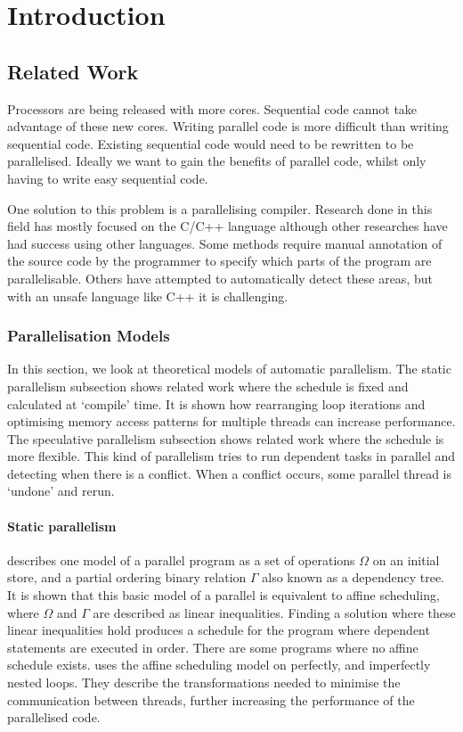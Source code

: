 \chapter{Introduction}

\section{Related Work}
\label{sec:related-work}

Processors are being released with more cores. Sequential code cannot take advantage of these new cores. Writing parallel code is more difficult than writing sequential code. Existing sequential code would need to be rewritten to be parallelised. Ideally we want to gain the benefits of parallel code, whilst only having to write easy sequential code.

One solution to this problem is a parallelising compiler. Research done in this field has mostly focused on the C/C++ language although other researches have had success using other languages. Some methods require manual annotation of the source code by the programmer to specify which parts of the program are parallelisable. Others have attempted to automatically detect these areas, but with an unsafe language like C++ it is challenging.

\subsection{Parallelisation Models}
\label{sec:related-models}
In this section, we look at theoretical models of automatic parallelism. The static parallelism subsection shows related work where the schedule is fixed and calculated at `compile' time. It is shown how rearranging loop iterations and optimising memory access patterns for multiple threads can increase performance. The speculative parallelism subsection shows related work where the schedule is more flexible. This kind of parallelism tries to run dependent tasks in parallel and detecting when there is a conflict. When a conflict occurs, some parallel thread is `undone' and rerun.

\subsubsection{Static parallelism}
\textcite{Feautrier1992} describes one model of a parallel program as a set of operations $\Omega$ on an initial store, and a partial ordering binary relation $\Gamma$ also known as a dependency tree. It is shown that this basic model of a parallel is equivalent to affine scheduling, where $\Omega$ and $\Gamma$ are described as linear inequalities. Finding a solution where these linear inequalities hold produces a schedule for the program where dependent statements are executed in order. There are some programs where no affine schedule exists.
\textcite{Bondhugula2008} uses the affine scheduling model on perfectly, and imperfectly nested loops. They describe the transformations needed to minimise the communication between threads, further increasing the performance of the parallelised code.

